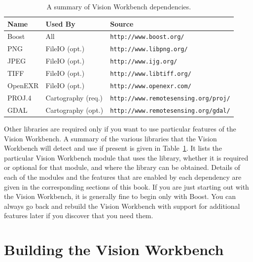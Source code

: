 \begin{table}[t]\begin{centering}
\begin{tabular}{|l|l|l|} \hline
Name    & Used By            & Source                                    \\ \hline \hline
Boost   & All                & \verb#http://www.boost.org/#              \\ \hline
PNG     & FileIO (opt.)      & \verb#http://www.libpng.org/#             \\ \hline
JPEG    & FileIO (opt.)      & \verb#http://www.ijg.org/#                \\ \hline
TIFF    & FileIO (opt.)      & \verb#http://www.libtiff.org/#            \\ \hline
OpenEXR & FileIO (opt.)      & \verb#http://www.openexr.com/#            \\ \hline
PROJ.4  & Cartography (req.) & \verb#http://www.remotesensing.org/proj/# \\ \hline
GDAL    & Cartography (opt.) & \verb#http://www.remotesensing.org/gdal/# \\ \hline
\end{tabular}
\caption{A summary of Vision Workbench dependencies.}
\label{tbl:dependencies}
\end{centering}\end{table}

Other libraries are required only if you want to use particular
features of the Vision Workbench.  A summary of the various libraries
that the Vision Workbench will detect and use if present is given in
Table~\ref{tbl:dependencies}.  It lists the particular Vision
Workbench module that uses the library, whether it is required or
optional for that module, and where the library can be obtained.
Details of each of the modules and the features that are enabled by
each dependency are given in the corresponding sections of this book.
If you are just starting out with the Vision Workbench, it is
generally fine to begin only with Boost.  You can always go back and 
rebuild the Vision Workbench with support for additional features 
later if you discover that you need them.

\section{Building the Vision Workbench}

